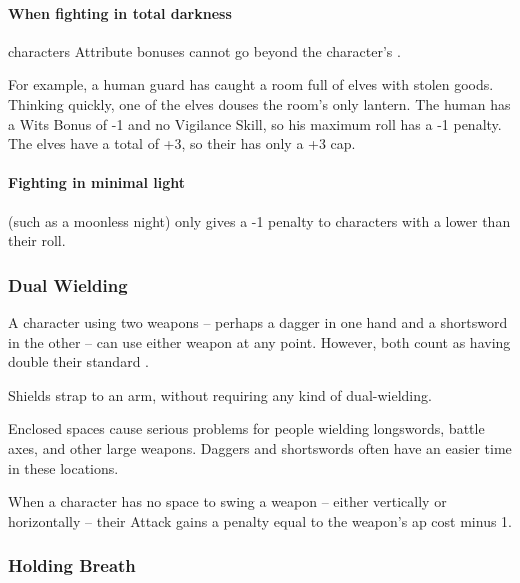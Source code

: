 \begin{multicols}{2}
\paragraph*{When fighting in total darkness}
characters Attribute bonuses cannot go beyond the character's .

\begin{exampletext}
  For example, a human guard has caught a room full of elves with stolen goods.
  Thinking quickly, one of the elves douses the room's only lantern.
  The human has a Wits Bonus of -1 and no Vigilance Skill, so his maximum roll has a -1 penalty.
  The elves have a total  of +3, so their  has only a +3 cap.
\end{exampletext}

\paragraph*{Fighting in minimal light}
(such as a moonless night)
only gives a -1 penalty to characters with a  lower than their roll.

\subsubsection[Dual Wielding: Both weapons count has having +1 \glsentrytext{weight}]{Dual Wielding}

A character using two weapons -- perhaps a dagger in one hand and a shortsword in the other -- can use either weapon at any point.
However, both count as having double their standard .

Shields strap to an arm, without requiring any kind of dual-wielding.


Enclosed spaces cause serious problems for people wielding longswords, battle axes, and other large weapons.
Daggers and shortswords often have an easier time in these locations.

When a character has no space to swing a weapon -- either vertically or horizontally -- their Attack gains a penalty equal to the weapon's \gls{ap} cost minus 1.

\subsubsection[Holding Breath: 1 \glsentrytext{ep} per negative \glsentrytext{ap} at the end of the round, plus 1~per round]{Holding Breath}
\label{holdingBreath}


\end{multicols}
